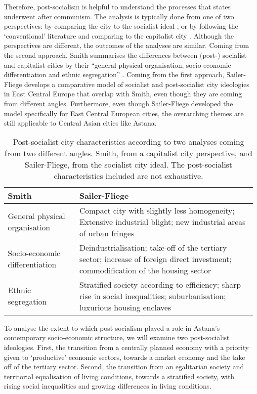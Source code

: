 \documentclass{article}
\begin{document}
Therefore, post-socialism is helpful to understand the processes that states underwent after communism. The analysis is typically done from one of two perspectives: by comparing the city to the socialist ideal \parencite{sailer1999characteristics}, or by following the `conventional' literature and comparing to the capitalist city \parencite{smith1996socialist} \parencite{haussermann1996socialist}. Although the perspectives are different, the outcomes of the analyses are similar. Coming from the second approach, Smith summarises the differences between (post-) socialist and capitalist cities by their ``general physical organisation, socio-economic differentiation and ethnic segregation'' \parencite{smith1996socialist}. Coming from the first approach, Sailer-Fliege develops a comparative model of socialist and post-socialist city ideologies in East Central Europe that overlap with Smith, even though they are coming from different angles. Furthermore, even though Sailer-Fliege developed the model specifically for East Central European cities, the overarching themes are still applicable to Central Asian cities like Astana.

\hfill
\bgroup
\def\arraystretch{1.5}
\begin{table}[h!]
\centering
\begin{tabularx}{\textwidth} {
  | >{\centering\arraybackslash}X 
  | >{\centering\arraybackslash}X |}
	\hline
	\textbf{Smith} & \textbf{Sailer-Fliege} \\ 
	\hline
	General physical organisation & 
	Compact city with slightly less homogeneity; Extensive industrial blight; new industrial areas of urban fringes \\ 
	\hline
	Socio-economic differentiation & 
	Deindustrialisation; take-off of the tertiary sector; increase of foreign direct investment; commodification of the housing sector \\ 
	\hline
	Ethnic segregation & 
	Stratified society according to efficiency; sharp rise in social inequalities; suburbanisation; luxurious housing enclaves \\
	\hline
\end{tabularx}
\caption{Post-socialist city characteristics according to two analyses coming from two different angles. Smith, from a capitalist city perspective, and Sailer-Fliege, from the socialist city ideal. The post-socialist characteristics included are not exhaustive.}
\label{table:1}
\end{table}
\egroup
\hfill

To analyse the extent to which post-socialism played a role in Astana's contemporary socio-economic structure, we will examine two post-socialist ideologies. First, the transition from a centrally planned economy with a priority given to `productive' economic sectors, towards a market economy and the take off of the tertiary sector. Second, the transition from an egalitarian society and territorial equalisation of living conditions, towards a stratified society, with rising social inequalities and growing differences in living conditions.
\end{document}
